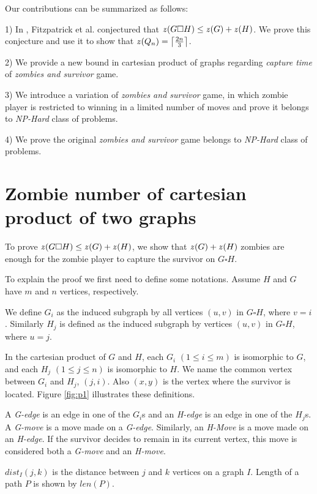 \documentclass[1p]{elsarticle}
\DeclarePairedDelimiter\ceil{\lceil}{\rceil} \DeclarePairedDelimiter\floor{\lfloor}{\rfloor}
\newcommand{\zn}{\ooalign{$z$\cr\hfil\rule[.5ex]{.2em}{.08ex}\hfil\cr}}
\begin{document}
Our contributions can be summarized as follows:

1) In \cite{Fitz16}, Fitzpatrick et al. conjectured that $\zn(G \square H) \leq \zn(G) + \zn(H)$. We prove this conjecture and
use it to show that $\zn(Q_n) = \ceil*{\frac{2n}{3}}$. 

2) We provide a new bound in cartesian product of graphs regarding {\it capture time} of {\it zombies and survivor} game.

3) We introduce a variation of {\it zombies and survivor} game, in which zombie player is restricted to winning in a
limited number of moves and prove it belongs to {\it NP-Hard} class of problems.

4) We prove the original {\it zombies and survivor} game belongs to {\it NP-Hard} class of problems.


\section{Zombie number of cartesian product of two graphs}\label{conj-proof}

To prove $\zn(G \square H) \leq \zn(G) + \zn(H)$, we show that $\zn(G) + \zn(H)$ zombies are enough for the zombie player to
capture the survivor on $G \square H$.

To explain the proof we first need to define some notations. Assume $H$ and $G$ have $m$ and $n$ vertices,
respectively. 

We define $G_{i}$ as the induced subgraph by all vertices $(u,v)$ in $G \square H$, where $v=i$. Similarly $H_{j}$ is
defined as the induced subgraph by vertices $(u,v)$ in $G \square H$, where $u=j$.

In the cartesian product of $G$ and $H$, each $G_{i}$ $(1 \leq i \leq m)$ is isomorphic to $G$, and each $H_{j}$ $(1
\leq j \leq n)$ is isomorphic to $H$. We name the common vertex between $G_{i}$ and $H_{j}$, $(j,i)$. Also $(x,y)$ is
the vertex where the survivor is located. Figure \ref{fig:p1} illustrates these definitions.

A {\it G-edge} is an edge in one of the $G_{i}$s and an {\it H-edge} is an edge in one of the $H_{j}$s. A {\it G-move}
is a move made on a {\it G-edge}. Similarly, an {\it H-Move} is a move made on an {\it H-edge}. If the survivor decides
to remain in its current vertex, this move is considered both a {\it G-move} and an {\it H-move}. 

$dist_I(j,k)$ is the distance between $j$ and $k$ vertices on a graph $I$. Length of a path $P$ is shown by $len(P)$. 
\end{document}
